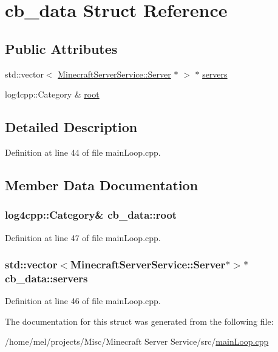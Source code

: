 \hypertarget{structcb__data}{}\section{cb\+\_\+data Struct Reference}
\label{structcb__data}
\subsection*{Public Attributes}
\begin{DoxyCompactItemize}
\item 
std\+::vector$<$ \hyperlink{class_minecraft_server_service_1_1_server}{Minecraft\+Server\+Service\+::\+Server} $\ast$ $>$ $\ast$ \hyperlink{structcb__data_a021c92f78fbef47a018c0423606ce946}{servers}
\item 
log4cpp\+::\+Category \& \hyperlink{structcb__data_a7dfb2fb06414483cd5b24e47c774165f}{root}
\end{DoxyCompactItemize}


\subsection{Detailed Description}


Definition at line 44 of file main\+Loop.\+cpp.



\subsection{Member Data Documentation}
\subsubsection[{\texorpdfstring{root}{root}}]{\setlength{\rightskip}{0pt plus 5cm}log4cpp\+::\+Category\& cb\+\_\+data\+::root}\hypertarget{structcb__data_a7dfb2fb06414483cd5b24e47c774165f}{}\label{structcb__data_a7dfb2fb06414483cd5b24e47c774165f}


Definition at line 47 of file main\+Loop.\+cpp.

\subsubsection[{\texorpdfstring{servers}{servers}}]{\setlength{\rightskip}{0pt plus 5cm}std\+::vector$<${\bf Minecraft\+Server\+Service\+::\+Server}$\ast$$>$$\ast$ cb\+\_\+data\+::servers}\hypertarget{structcb__data_a021c92f78fbef47a018c0423606ce946}{}\label{structcb__data_a021c92f78fbef47a018c0423606ce946}


Definition at line 46 of file main\+Loop.\+cpp.



The documentation for this struct was generated from the following file\+:\begin{DoxyCompactItemize}
\item 
/home/mel/projects/\+Misc/\+Minecraft Server Service/src/\hyperlink{main_loop_8cpp}{main\+Loop.\+cpp}\end{DoxyCompactItemize}
